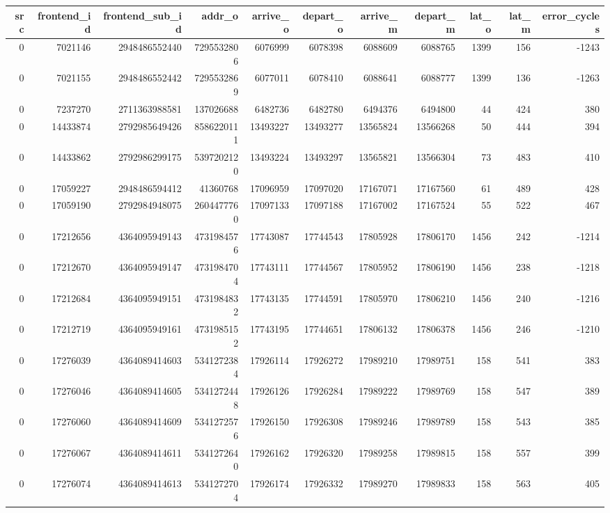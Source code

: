 \begin{tabular}{rrrrrrrrrrr}
\toprule
src & frontend\_id & frontend\_sub\_id & addr\_o & arrive\_o & depart\_o & arrive\_m & depart\_m & lat\_o & lat\_m & error\_cycles \\
\midrule
0 & 7021146 & 2948486552440 & 7295532806 & 6076999 & 6078398 & 6088609 & 6088765 & 1399 & 156 & -1243 \\
0 & 7021155 & 2948486552442 & 7295532869 & 6077011 & 6078410 & 6088641 & 6088777 & 1399 & 136 & -1263 \\
0 & 7237270 & 2711363988581 & 137026688 & 6482736 & 6482780 & 6494376 & 6494800 & 44 & 424 & 380 \\
0 & 14433874 & 2792985649426 & 8586220111 & 13493227 & 13493277 & 13565824 & 13566268 & 50 & 444 & 394 \\
0 & 14433862 & 2792986299175 & 5397202120 & 13493224 & 13493297 & 13565821 & 13566304 & 73 & 483 & 410 \\
0 & 17059227 & 2948486594412 & 41360768 & 17096959 & 17097020 & 17167071 & 17167560 & 61 & 489 & 428 \\
0 & 17059190 & 2792984948075 & 2604477760 & 17097133 & 17097188 & 17167002 & 17167524 & 55 & 522 & 467 \\
0 & 17212656 & 4364095949143 & 4731984576 & 17743087 & 17744543 & 17805928 & 17806170 & 1456 & 242 & -1214 \\
0 & 17212670 & 4364095949147 & 4731984704 & 17743111 & 17744567 & 17805952 & 17806190 & 1456 & 238 & -1218 \\
0 & 17212684 & 4364095949151 & 4731984832 & 17743135 & 17744591 & 17805970 & 17806210 & 1456 & 240 & -1216 \\
0 & 17212719 & 4364095949161 & 4731985152 & 17743195 & 17744651 & 17806132 & 17806378 & 1456 & 246 & -1210 \\
0 & 17276039 & 4364089414603 & 5341272384 & 17926114 & 17926272 & 17989210 & 17989751 & 158 & 541 & 383 \\
0 & 17276046 & 4364089414605 & 5341272448 & 17926126 & 17926284 & 17989222 & 17989769 & 158 & 547 & 389 \\
0 & 17276060 & 4364089414609 & 5341272576 & 17926150 & 17926308 & 17989246 & 17989789 & 158 & 543 & 385 \\
0 & 17276067 & 4364089414611 & 5341272640 & 17926162 & 17926320 & 17989258 & 17989815 & 158 & 557 & 399 \\
0 & 17276074 & 4364089414613 & 5341272704 & 17926174 & 17926332 & 17989270 & 17989833 & 158 & 563 & 405 \\

\end{tabular}
